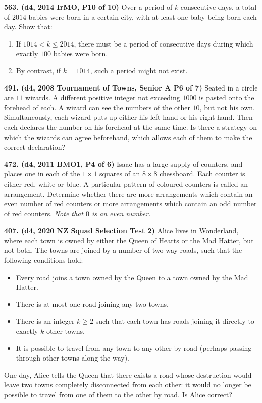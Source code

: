 \documentclass{article}
\begin{document}
        \textbf{563. (\color{red}d4\color{black}, 2014 IrMO, P10 of 10)} Over a period of $k$ consecutive days, a total of $2014$ babies were born in a certain city, with at least one baby being born each day. Show that:
        \renewcommand{\labelenumi}{\theenumi}
        \renewcommand{\theenumi}{(\roman{enumi})}
        \begin{enumerate}
                \item If $1014 < k \le 2014$, there must be a period of consecutive days during which exactly $100$ babies were born.
                \item By contrast, if $k = 1014$, such a period might not exist.
        \end{enumerate}

        \textbf{491. (\color{red}d4\color{black}, 2008 Tournament of Towns, Senior A P6 of 7)} Seated in a circle are $11$ wizards. A different positive integer not exceeding $1000$ is pasted onto the forehead of each. A wizard can see the numbers of the other $10$, but not his own. Simultaneously, each wizard puts up either his left hand or his right hand. Then each declares the number on his forehead at the same time. Is there a strategy on which the wizards can agree beforehand, which allows each of them to make the correct declaration?

        \textbf{472. (\color{red}d4\color{black}, 2011 BMO1, P4 of 6)} Isaac has a large supply of counters, and places one in each of the $1\times 1$ squares of an $8\times 8$ chessboard. Each counter is either red, white or blue. A particular pattern of coloured counters is called an arrangement. Determine whether there are more arrangements which contain an even number of red counters or more arrangements which contain an odd number of red counters. \emph{Note that $0$ is an even number.}

        \textbf{407. (\color{red}d4\color{black}, 2020 NZ Squad Selection Test 2)} Alice lives in Wonderland, where each town is owned by either the Queen of Hearts or the Mad Hatter, but not both. The towns are joined by a number of two-way roads, such that the following conditions hold:
        \begin{itemize}\item Every road joins a town owned by the Queen to a town owned by the Mad Hatter. \item There is at most one road joining any two towns. \item There is an integer $k \geq 2$ such that each town has roads joining it directly to exactly $k$ other towns. \item It is possible to travel from any town to any other by road (perhaps passing through other towns along the way). \end{itemize}
        One day, Alice tells the Queen that there exists a road whose destruction would leave two towns completely disconnected from each other: it would no longer be possible to travel from one of them to the other by road. Is Alice correct?
\end{document}
